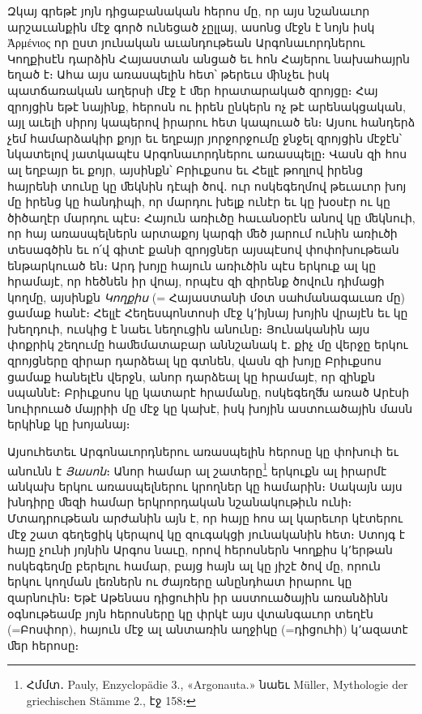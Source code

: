 \documentclass{article}
\begin{document}
{Զկայ գրեթէ յոյն դիցաբանական հերոս մը, որ այս նշանաւոր արշաւանքին մէջ գործ ունեցած չըլլայ, ասոնց մէջն է նոյն իսկ Ἀρμένιος որ ըստ յունական աւանդութեան Արգոնաւորդներու Կողքիսէն դարձին Հայաստան անցած եւ հոն Հայերու նախահայրն եղած է։ Ահա այս առասպելին հետ՝ թերեւս ﬕնչեւ իսկ պատճառական աղերսի մէջ է ﬔր հրատարակած զրոյցը։ Հայ զրոյցին եթէ նայինք, հերոսն ու իրեն ընկերն ոչ թէ արենակցական, այլ աւելի սիրոյ կապերով իրարու հետ կապուած են։ Այսու հանդերձ չեմ համարձակիր քոյր եւ եղբայր յորջորջումը ջնջել զրոյցին մէջէն՝ նկատելով յատկապէս Արգոնաւորդներու առասպելը։ Վասն զի հոս ալ եղբայր եւ քոյր, այսինքն՝ Բրիւքսոս եւ Հելլէ թողլով իրենց հայրենի տունը կը ﬔկնին դէպի ծով․ ուր ոսկեգեղմով թեւաւոր խոյ մը իրենց կը հանդիպի, որ մարդու խելք ունէր եւ կը խօսէր ու կը ծիծաղէր մարդու պէս։ Հայուն առիւծը հաւանօրէն անով կը ﬔկնուի, որ հայ առասպելներն արտաքոյ կարգի ﬔծ յարում ունին առիւծի տեսագծին եւ ո՛վ գիտէ քանի զրոյցներ այսպէսով փոփոխութեան ենթարկուած են։ Արդ խոյը հայուն առիւծին պէս երկուք ալ կը հրամայէ, որ հեծնեն իր վոայ, որպէս զի զիրենք ծովուն դիմացի կողմը, այսինքն \emph{Կողքիս} (= Հայաստանի մօտ սահմանագաւառ մը) ցամաք հանէ։ Հելլէ Հեղեսպոնտոսի մէջ կ՚իյնայ խոյին վրայէն եւ կը խեղդուի, ուսկից է նաեւ նեղուցին անունը։ Յունականին այս փոքրիկ շեղումը հաﬔմատաբար աննշանակ է․ քիչ մը վերջը երկու զրոյցները զիրար դարձեալ կը գտնեն, վասն զի խոյը Բրիւքսոս ցամաք հանելէն վերջն, անոր դարձեալ կը հրամայէ, որ զինքն սպաննէ։ Բրիւքսոս կը կատարէ հրամանը, ոսկեգեղﬓ առած Արէսի նուիրուած մայրիի մը մէջ կը կախէ, իսկ խոյին աստուածային մասն երկինք կը խոյանայ։

Այսուհետեւ Արգոնաւորդներու առասպելին հերոսը կը փոխուի եւ անունն է \emph{Յասոն}։ Անոր համար ալ շատերը\footnote{Հմմտ․ Pauly, Enzyclopädie 3., «Argonauta.» նաեւ Müller, Mythologie der griechischen Stämme 2., էջ 158։} երկուքն ալ իրարմէ անկախ երկու առասպելներու կրողներ կը համարին։ Սակայն այս խնդիրը ﬔզի համար երկրորդական նշանակութիւն ունի։ Մտադրութեան արժանին այն է, որ հայը հոս ալ կարեւոր կէտերու մէջ շատ գեղեցիկ կերպով կը զուգակցի յունականին հետ։ Ստոյգ է հայը չունի յոյնին Արգոս նաւը, որով հերոսներն Կողքիս կ՚երթան ոսկեգեղմը բերելու համար, բայց հայն ալ կը յիշէ ծով մը, որուն երկու կողման լեռներն ու ժայռերը անընդհատ իրարու կը զարնուին։ Եթէ Աթենաս դիցուհին իր աստուածային առանձինն օգնութեամբ յոյն հերոսները կը փրկէ այս վտանգաւոր տեղէն (=Բոսփոր), հայուն մէջ ալ անտառին աղջիկը (=դիցուհի) կ՚ազատէ ﬔր հերոսը։

}
\end{document}
